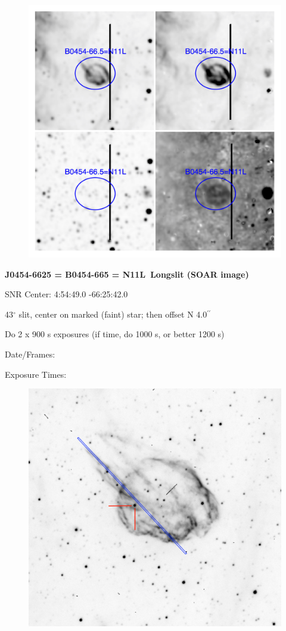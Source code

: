 \documentclass[11pt]{article}
\newcommand{\arcsec}{$^{\prime\prime}$}
\begin{document}
\begin{figure}
\includegraphics[width=12.5cm]{snapshots/N11L.png}
\end{figure}

\newpage
{\bf J0454-6625 = B0454-665 = N11L\ Longslit (SOAR image)}

SNR Center:   4:54:49.0   -66:25:42.0     

43$^\circ$ slit, center on marked (faint) star; then offset N 4.0\arcsec

Do 2 x 900 s exposures  (if time, do 1000 s, or better 1200 s)

Date/Frames:  

Exposure Times:  

\begin{figure}
\includegraphics[width=12.5cm]{snapshots/N11L_longslit.png}
\end{figure}
\end{document}
